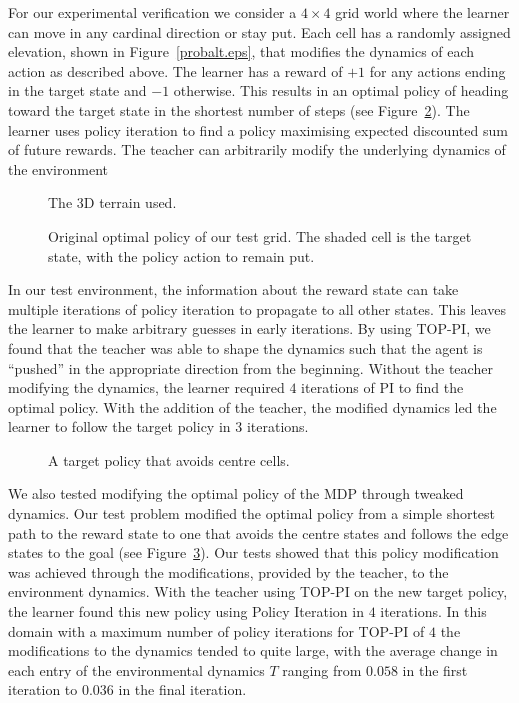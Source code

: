 For our experimental verification we consider a $4 \times 4$ grid world where the learner can move in any cardinal direction or stay put.  Each cell has a randomly assigned elevation, shown in Figure~\ref{probalt.eps}, that modifies the dynamics of each action as described above.  The learner has a reward of $+1$ for any actions ending in the target state and $-1$ otherwise.  This results in an optimal policy of heading toward the target state in the shortest number of steps (see Figure~\ref{prevopt}).  The learner uses policy iteration to find a policy maximising expected discounted sum of future rewards.  The teacher can arbitrarily modify the underlying dynamics of the environment

\begin{figure}[ht]
\centerline{}
\caption{\label{probalt}The 3D terrain used.}
\end{figure}

\begin{figure}[ht]
\centerline{}
\caption{\label{prevopt}Original optimal policy of our test grid.  The shaded cell is the target state, with the policy action to remain put.}
\end{figure}

In our test environment, the information about the reward state can take multiple iterations of policy iteration to propagate to all other states.  This leaves the learner to make arbitrary guesses in early iterations.  By using TOP-PI, we found that the teacher was able to shape the dynamics such that the agent is ``pushed'' in the appropriate direction from the beginning.  Without the teacher modifying the dynamics, the learner required $4$ iterations of PI to find the optimal policy.  With the addition of the teacher, the modified dynamics led the learner to follow the target policy in $3$ iterations.

\begin{figure}[ht]
\centerline{}
\caption{\label{newopt}A target policy that avoids centre cells.}
\end{figure}

We also tested modifying the optimal policy of the MDP through tweaked dynamics.  Our test problem modified the optimal policy from a simple shortest path to the reward state to one that avoids the centre states and follows the edge states to the goal (see Figure~\ref{newopt}).  Our tests showed that this policy modification was achieved through the modifications, provided by the teacher, to the environment dynamics.   With the teacher using TOP-PI on the new target policy, the learner found this new policy using Policy Iteration in $4$ iterations.  In this domain with a maximum number of policy iterations for TOP-PI of $4$ the modifications to the dynamics tended to quite large, with the average change in each entry of the environmental dynamics $T$ ranging from $0.058$ in the first iteration to $0.036$ in the final iteration.

